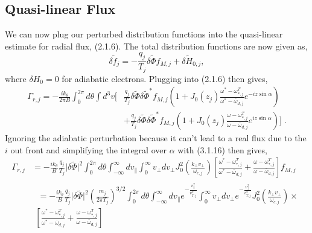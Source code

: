 \documentclass[12pt]{article}
\numberwithin{equation}{subsection}
\begin{document}
\subsection{Quasi-linear Flux}
   \quad We can now plug our perturbed distribution functions into the quasi-linear estimate for radial flux, (2.1.6). The total
distribution functions are now given as,
   \begin{equation}
      \delta \widetilde{f}_j = -\frac{q_j}{T_j}\delta\widetilde{\Phi}f_{M,j} + \delta\widetilde{H}_{0,j},
   \end{equation}
where $\delta H_0 = 0$ for adiabatic electrons. Plugging into (2.1.6) then gives,
   \begin{equation}
   \begin{aligned}
      \Gamma_{r,j} = -\frac{ik_\theta}{2\pi B}\int_{0}^{2\pi}d\theta\int d^3v
            [&\frac{q_j}{T_j}\delta\widetilde{\Phi}\delta\widetilde{\Phi}^*f_{M,j}(1+J_0(z_j)\frac{\omega^*-\omega^T_{*,j}}{\omega^*-\bar{\omega}_{d,j}}e^{-iz\sin\alpha}) \\
             & + \frac{q_j}{T_j}\delta\widetilde{\Phi}\delta\widetilde{\Phi}^*f_{M,j}(1+J_0(z_j)\frac{\omega-\omega^T_{*,j}}{\omega-\bar{\omega}_{d,j}}e^{iz\sin\alpha})]\;.
   \end{aligned}
   \end{equation}
Ignoring the adiabatic perturbation because it can't lead to a real flux due to the $i$ out front and simplifying the integral over $\alpha$ with
(3.1.16) then gives,
   \begin{equation}
   \begin{aligned}
      \Gamma_{r,j} &= -\frac{ik_\theta}{B}\frac{q_j}{T_j}\lvert\delta\widetilde{\Phi}\rvert^2\int_{0}^{2\pi}d\theta\int_{-\infty}^{\infty}dv_\parallel
                      \int_{0}^{\infty}v_\perp dv_\perp J_0^2(\frac{k_\perp v_\perp}{\omega_{c,j}})
                      [\frac{\omega^*-\omega^T_{*,j}}{\omega^*-\bar{\omega}_{d,j}} + \frac{\omega-\omega^T_{*,j}}{\omega-\bar{\omega}_{d,j}}]f_{M,j} \\
                   & 
                      \begin{aligned} \;=
                      -\frac{ik_\theta}{B}\frac{q_j}{T_j}\lvert\delta\widetilde{\Phi}\rvert^2\left(\frac{m_j}{2\pi T_j}\right)^{3/2}
                      \int_{0}^{2\pi}d\theta\int_{-\infty}^{\infty}dv_\parallel e^{-\frac{v_\parallel^2}{v_{T,j}^2}}
                      \int_{0}^{\infty}v_\perp dv_\perp e^{-\frac{v_\perp^2}{v_{T,j}^2}}
                      J_0^2(\frac{k_\perp v_\perp}{\omega_{c,j}})\times \\
                      [\frac{\omega^*-\omega^T_{*,j}}{\omega^*-\bar{\omega}_{d,j}}
                       + \frac{\omega-\omega^T_{*,j}}{\omega-\bar{\omega}_{d,j}}]
                      \end{aligned}
   \end{aligned}
   \end{equation}
\end{document}
